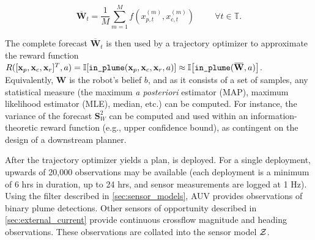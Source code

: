 \begin{equation}
    \overbar{\mathbf{W}}_t = \frac{1}{M}\sum_{m=1}^{M} f(x_{p,t}^{(m)}, x_{c,t}^{(m)}) \hspace{1cm} \forall t \in \mathbb{T}.
\end{equation}

The complete forecast $\overbar{\mathbf{W}}_t$ is then used by a trajectory optimizer to approximate the reward function $R([\x_p, \x_c, \x_r]^T, a) = \indic{\texttt{in\_plume}(\x_p, \x_c, \x_r, a)} \approx \indic{\texttt{in\_plume}(\overbar{\mathbf{W}}, a)}$. Equivalently, $\mathbf{W}$ is the robot's belief $b$, and as it consists of a set of samples, any statistical measure (the maximum \emph{a posteriori} estimator (MAP), maximum likelihood estimator (MLE), median, etc.) can be computed. For instance, the variance of the forecast $\mathbf{S}^2_W$ can be computed and used within an information-theoretic reward function (e.g., upper confidence bound), as contingent on the design of a downstream planner. 

After the trajectory optimizer yields a plan, \Sentry is deployed. For a single deployment, upwards of 20,000 observations may be available (each deployment is a minimum of 6 hrs in duration, up to 24 hrs, and sensor measurements are logged at 1 Hz). Using the filter described in \cref{sec:sensor_models}, AUV \Sentry provides observations of binary plume detections. Other sensors of opportunity described in \cref{sec:external_current} provide continuous crossflow magnitude and heading observations. These observations are collated into the sensor model $\mathcal{Z}$.

